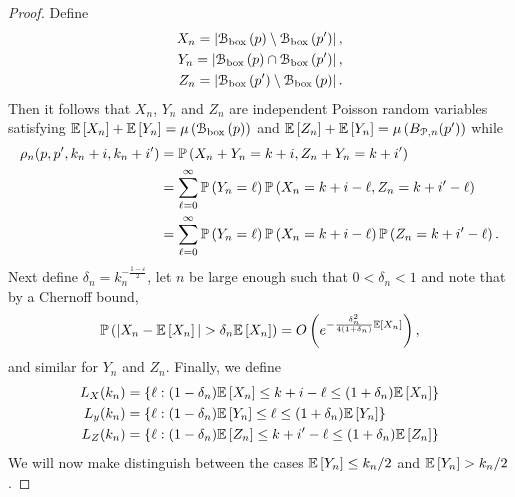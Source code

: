 \begin{proof}
Define
\begin{align*}
	X_n = \left|{\mathcal B}_{\text{box}}\left(p\right) \setminus {\mathcal B}_{\text{box}}\left(p^\prime\right)\right|,\\
	Y_n = \left|{\mathcal B}_{\text{box}}\left(p\right) \cap {\mathcal B}_{\text{box}}\left(p^\prime\right)\right|,\\
	Z_n = \left|{\mathcal B}_{\text{box}}\left(p^\prime\right) \setminus {\mathcal B}_{\text{box}}\left(p\right)\right|.
\end{align*}
Then it follows that $X_n$, $Y_n$ and $Z_n$ are independent Poisson random variables satisfying $\mathbb{E}\left[X_n\right] + \mathbb{E}\left[Y_n\right] = \mu\left({\mathcal B}_{\text{box}}\left(p\right)\right)$ and $\mathbb{E}\left[Z_n\right] + \mathbb{E}\left[Y_n\right] = \mu\left(B_{{\mathcal P},n}(p^\prime)\right)$ while
\begin{align*}
	\rho_n(p,p^\prime,k_n + i,k_n + i^\prime) &= \mathbb{P}\left(X_n + Y_n = k + i, Z_n + Y_n = k + i^\prime\right)\\
	&= \sum_{\ell = 0}^\infty \mathbb{P}\left(Y_n = \ell\right) \mathbb{P}\left(X_n = k + i - \ell, Z_n = k + i^\prime - \ell\right) \\
	&= \sum_{\ell = 0}^\infty \mathbb{P}\left(Y_n = \ell\right) \mathbb{P}\left(X_n = k + i - \ell\right) \mathbb{P}\left(Z_n = k + i^\prime - \ell\right).
\end{align*}
Next define $\delta_n = k_n^{-\frac{1-\varepsilon}{2}}$, let $n$ be large enough such that $0 < \delta_n < 1$ and note that by a Chernoff bound,
\[
	\mathbb{P}\left(|X_n - \mathbb{E}\left[X_n\right]| > \delta_n \mathbb{E}\left[X_n\right]\right) = O\left(e^{-\frac{\delta_n^2}{4(1+\delta_n)} \mathbb{E}\left[X_n\right]}\right),
\]
and similar for $Y_n$ and $Z_n$. Finally, we define
\begin{align*}
	L_X(k_n) &= \left\{\ell : (1 - \delta_n) \mathbb{E}\left[X_n\right] \le k + i - \ell \le (1+\delta_n)\mathbb{E}\left[X_n\right]\right\} \\
	L_y(k_n) &= \left\{\ell : (1 - \delta_n) \mathbb{E}\left[Y_n\right] \le \ell \le (1+\delta_n)\mathbb{E}\left[Y_n\right]\right\}\\
	L_Z(k_n) &= \left\{\ell : (1 - \delta_n) \mathbb{E}\left[Z_n\right] \le k + i^\prime - \ell \le (1+\delta_n)\mathbb{E}\left[Z_n\right]\right\}
\end{align*}
We will now make distinguish between the cases $\mathbb{E}\left[Y_n\right] \le k_n/2$ and $\mathbb{E}\left[Y_n\right] > k_n/2$. 


\end{proof}

